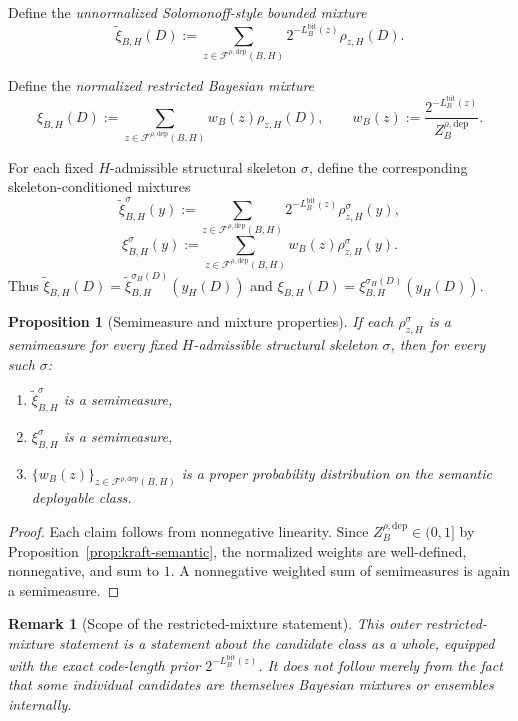 \documentclass[11pt]{article}
\newtheorem{proposition}{Proposition}
\newtheorem{remark}{Remark}
\begin{document}
Define the \emph{unnormalized Solomonoff-style bounded mixture}
\[
\widetilde{\xi}_{B,H}(D)
:=
\sum_{z\in\mathcal{F}^{\rho,\mathrm{dep}}(B,H)}
2^{-L_B^{\mathrm{bit}}(z)}\rho_{z,H}(D).
\]

Define the \emph{normalized restricted Bayesian mixture}
\[
\xi_{B,H}(D)
:=
\sum_{z\in\mathcal{F}^{\rho,\mathrm{dep}}(B,H)}
w_B(z)\rho_{z,H}(D),
\qquad
w_B(z):=\frac{2^{-L_B^{\mathrm{bit}}(z)}}{Z_B^{\rho,\mathrm{dep}}}.
\]

For each fixed $H$-admissible structural skeleton $\sigma$, define the
corresponding skeleton-conditioned mixtures
\[
\widetilde{\xi}_{B,H}^{\sigma}(y)
:=
\sum_{z\in\mathcal{F}^{\rho,\mathrm{dep}}(B,H)}
2^{-L_B^{\mathrm{bit}}(z)}\rho_{z,H}^{\sigma}(y),
\]
\[
\xi_{B,H}^{\sigma}(y)
:=
\sum_{z\in\mathcal{F}^{\rho,\mathrm{dep}}(B,H)}
w_B(z)\rho_{z,H}^{\sigma}(y).
\]
Thus
$\widetilde{\xi}_{B,H}(D)=\widetilde{\xi}_{B,H}^{\sigma_H(D)}(y_H(D))$ and
$\xi_{B,H}(D)=\xi_{B,H}^{\sigma_H(D)}(y_H(D))$.

\begin{proposition}[Semimeasure and mixture properties]
\label{prop:mixture-semimeasure}
If each $\rho_{z,H}^{\sigma}$ is a semimeasure for every fixed
$H$-admissible structural skeleton $\sigma$, then for every such $\sigma$:
\begin{enumerate}
    \item $\widetilde{\xi}_{B,H}^{\sigma}$ is a semimeasure,
    \item $\xi_{B,H}^{\sigma}$ is a semimeasure,
    \item $\{w_B(z)\}_{z\in\mathcal{F}^{\rho,\mathrm{dep}}(B,H)}$ is a proper
    probability distribution on the semantic deployable class.
\end{enumerate}
\end{proposition}

\begin{proof}
Each claim follows from nonnegative linearity. Since
$Z_B^{\rho,\mathrm{dep}}\in(0,1]$ by
Proposition~\ref{prop:kraft-semantic},
the normalized weights are well-defined, nonnegative, and sum to $1$.
A nonnegative weighted sum of semimeasures is again a semimeasure.
\end{proof}

\begin{remark}[Scope of the restricted-mixture statement]
This outer restricted-mixture statement is a statement about the candidate class
as a whole, equipped with the exact code-length prior
$2^{-L_B^{\mathrm{bit}}(z)}$. It does
not follow merely from the fact that some individual candidates are themselves
Bayesian mixtures or ensembles internally.
\end{remark}
\end{document}
